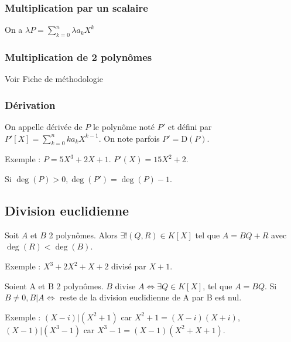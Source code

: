 \documentclass[french]{yLectureNote}
\begin{document}
\subsubsection{Multiplication par un scalaire}
On a $\lambda P = \sum^n_{k=0} \lambda a_kX^k$
\subsubsection{Multiplication de 2 polyn\^omes}
Voir Fiche de méthodologie
\subsubsection{Dérivation}
On appelle dérivée de $P$ le polyn\^ome noté $P'$ et défini par $P'[X] = \sum_{k=0}^n ka_kX^{k-1}$. On note parfois $P' = \mathrm{D}(P)$.

Exemple : $P = 5X^3+2X+1$. $P'(X) = 15X^2+2$.

Si $\deg(P)>0, \deg(P') = \deg(P)-1$.
\subsection{Division euclidienne}
\begin{theorem}
Soit $A$ et $B$ 2 polyn\^omes. Alors $\exists!(Q,R)\in K[X]$ tel que $A=BQ+R$ avec $\deg(R)<\deg(B)$.
\end{theorem}
Exemple : $X^3+2X^2+X+2$ divisé par $X+1$.

\begin{definition}[]
Soient A et B 2 polyn\^omes. $B$ divise $A \iff \exists Q\in K[X]$, tel que $A=BQ$. Si $B\neq 0, B|A\iff$ reste de la division euclidienne de A par B est nul.
\end{definition}
Exemple : $(X-i)|(X^2+1)$ car $X^2+1=(X-i)(X+i)$, $(X-1)|(X^3-1)$ car $X^3-1=(X-1)(X^2+X+1)$.
\end{document}

